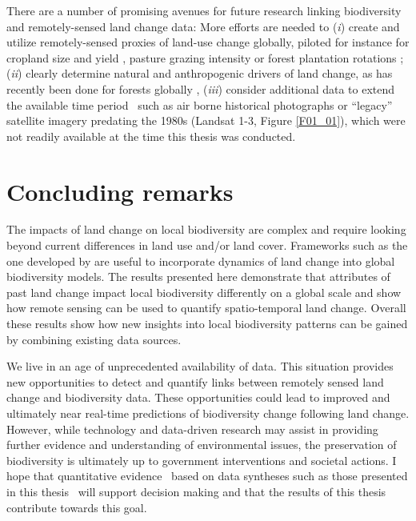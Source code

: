 There are a number of promising avenues for future research linking biodiversity and remotely-sensed land change data: More efforts are needed to (\textit{i}) create and utilize remotely-sensed proxies of land-use change globally, piloted for instance for cropland size \citep{Fritz2015} and yield \citep{Lobell2015}, pasture grazing intensity \citep{Rufin2015,Aguiar2017} or forest plantation rotations \citep{LeMaire2014}; (\textit{ii}) clearly determine natural and anthropogenic drivers of land change, as has recently been done for forests globally \citep{Curtis2018}, (\textit{iii}) consider additional data to extend the available time period \textendash\ such as air borne historical photographs \citep{SZABO2011,Cousins2015} or “legacy” satellite imagery predating the 1980s (\eg Landsat 1-3, Figure \ref{F01_01}), which were not readily available at the time this thesis was conducted.

\section{Concluding remarks}
\label{C06_04}

The impacts of land change on local biodiversity are complex and require looking beyond current differences in land use and/or land cover. Frameworks such as the one developed by \cite{Watson2014} are useful to incorporate dynamics of land change into global biodiversity models. The results presented here demonstrate that attributes of past land change impact local biodiversity differently on a global scale and show how remote sensing can be used to quantify spatio-temporal land change. Overall these results show how new insights into local biodiversity patterns can be gained by combining existing data sources.

We live in an age of unprecedented availability of data. This situation provides new opportunities to detect and quantify links between remotely sensed land change and biodiversity data. These opportunities could lead to improved and ultimately near real-time predictions of biodiversity change following land change. However, while technology and data-driven research may assist in providing further evidence and understanding of environmental issues, the preservation of biodiversity is ultimately up to government interventions and societal actions. I hope that quantitative evidence \textendash\ based on data syntheses such as those presented in this thesis \textendash\ will support decision making and that the results of this thesis contribute towards this goal.    


\clearpage
%

%  

